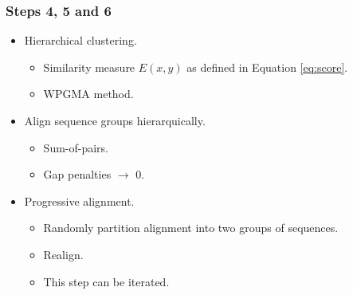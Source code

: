 \begin{frame}
    \frametitle{Steps 4, 5 and 6}
    \begin{itemize}
        \item Hierarchical clustering.
        \begin{itemize}
          \item Similarity measure $E(x,y)$ as defined in Equation \eqref{eq:score}.
          \item WPGMA method.
        \end{itemize}
        \item Align sequence groups hierarquically.
        \begin{itemize}
            \item Sum-of-pairs.
            \item Gap penalties $\rightarrow$ $0$.
        \end{itemize}
        \item Progressive alignment.
        \begin{itemize}
            \item Randomly partition alignment into two groups of sequences.
            \item Realign.
            \item This step can be iterated.
        \end{itemize}
    \end{itemize}
    
\end{frame}